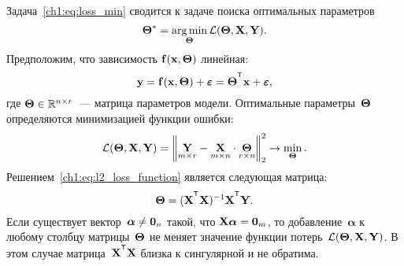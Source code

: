 \documentclass[11pt, a5paper]{dissert}
\begin{document}
Задача~\eqref{ch1:eq:loss_min} сводится к задаче поиска оптимальных параметров
\begin{equation}
	\boldsymbol{\Theta}^* = \mathop{\arg \min}\limits_{\boldsymbol{\Theta}} \mathcal{L}(\boldsymbol{\Theta}, \mathbf{X}, \mathbf{Y}).
	\label{ch1:eq:loss_min_param}
\end{equation}
Предположим, что зависимость $\mathbf{f}(\mathbf{x}, \boldsymbol{\Theta})$ линейная:
\begin{equation}
	\by = \mathbf{f}(\bx, \bTheta) + \bepsilon = \bTheta^{\T} \bx+ \bepsilon,
	\label{ch1:eq:lin_reg_model}
\end{equation}
где $\boldsymbol{\Theta} \in \mathbb{R}^{n \times r}$~--- матрица параметров модели.
Оптимальные параметры~$\boldsymbol{\Theta}$ определяются минимизацией функции ошибки:
\begin{equation}
	\mathcal{L}(\boldsymbol{\Theta}, \mathbf{X}, \mathbf{Y}) = {\left\| \underset{m \times r}{\mathbf{Y}}  - \underset{m \times n}{\mathbf{X}} \cdot \underset{r \times n}{\boldsymbol{\Theta}} \right\| }_2^2 \rightarrow\min_{\boldsymbol{\Theta}}.
	\label{ch1:eq:l2_loss_function}
\end{equation}
Решением~\eqref{ch1:eq:l2_loss_function} является следующая матрица:
\begin{equation*}
	\bTheta = (\bX^{\T} \bX)^{-1} \bX^{\T} \bY.
\end{equation*}
Если существует вектор~$\boldsymbol{\alpha} \neq \boldsymbol{0}_n$ такой, что $\mathbf{X} \boldsymbol{\alpha}= \boldsymbol{0}_m$, то добавление~$\boldsymbol{\alpha}$ к любому столбцу матрицы~$\boldsymbol{\Theta}$ не меняет значение функции потерь~$\mathcal{L}(\boldsymbol{\Theta}, \mathbf{X}, \mathbf{Y})$.
В этом случае матрица~$\bX^{\T} \bX$ близка к сингулярной и не обратима.
\end{document}
